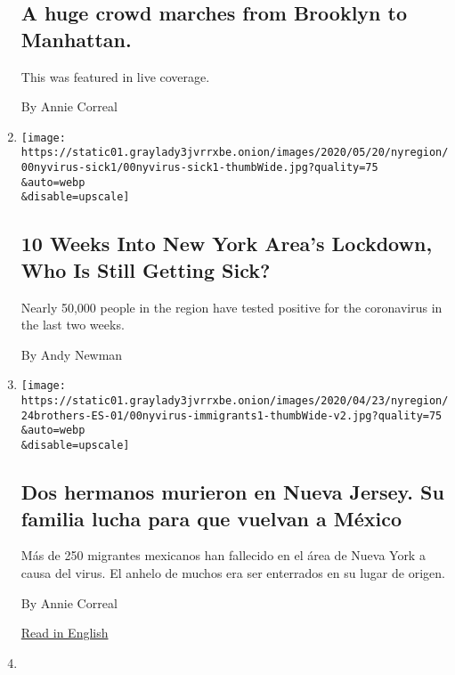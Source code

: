 \begin{enumerate}
{  \subsection{A huge crowd marches from Brooklyn to
  Manhattan.}\label{a-huge-crowd-marches-from-brooklyn-to-manhattan}}

  This was featured in live coverage.

  By Annie Correal
\item
  \href{/2020/05/28/nyregion/ny-coronavirus-new-cases.html}{}

  \texttt{[image: https://static01.graylady3jvrrxbe.onion/images/2020/05/20/nyregion/00nyvirus-sick1/00nyvirus-sick1-thumbWide.jpg?quality=75\\\&auto=webp\\\&disable=upscale]}

  \hypertarget{10-weeks-into-new-york-areas-lockdown-who-is-still-getting-sick}{%
  \subsection{10 Weeks Into New York Area's Lockdown, Who Is Still
  Getting
  Sick?}\label{10-weeks-into-new-york-areas-lockdown-who-is-still-getting-sick}}

  Nearly 50,000 people in the region have tested positive for the
  coronavirus in the last two weeks.

  By Andy Newman
\item
  \href{/es/2020/04/24/espanol/mundo/coronavirus-hermanos-nueva-york.html}{}

  \texttt{[image: https://static01.graylady3jvrrxbe.onion/images/2020/04/23/nyregion/24brothers-ES-01/00nyvirus-immigrants1-thumbWide-v2.jpg?quality=75\\\&auto=webp\\\&disable=upscale]}

  \hypertarget{dos-hermanos-murieron-en-nueva-jersey-su-familia-lucha-para-que-vuelvan-a-muxe9xico}{%
  \subsection{Dos hermanos murieron en Nueva Jersey. Su familia lucha
  para que vuelvan a
  México}\label{dos-hermanos-murieron-en-nueva-jersey-su-familia-lucha-para-que-vuelvan-a-muxe9xico}}

  Más de 250 migrantes mexicanos han fallecido en el área de Nueva York
  a causa del virus. El anhelo de muchos era ser enterrados en su lugar
  de origen.

  By Annie Correal

  \href{https://www.nytimes3xbfgragh.onion/2020/04/23/nyregion/coronavirus-new-york-Mexican-immigrant-deaths.html}{Read
  in English}
\item
  \href{/2020/04/23/nyregion/coronavirus-new-york-Mexican-immigrant-deaths.html}{}


\end{enumerate}

